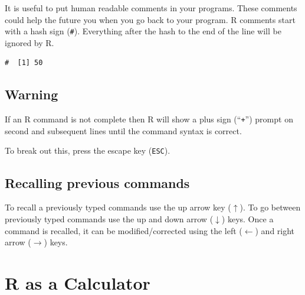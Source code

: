 \documentclass[a4paper,9pt,twocolumn,twoside,printwatermark=false]{pinp}
\begin{document}
It is useful to put human readable comments in your programs. These
comments could help the future you when you go back to your program. R
comments start with a hash sign (\texttt{\#}). Everything after the hash
to the end of the line will be ignored by R.

\begin{Shaded}
\begin{Highlighting}[]
\end{Highlighting}
\end{Shaded}

\begin{ShadedResult}
\begin{verbatim}
#  [1] 50
\end{verbatim}
\end{ShadedResult}

\subsection{Warning}\label{warning}

If an R command is not complete then R will show a plus sign
(``\texttt{+}'') prompt on second and subsequent lines until the command
syntax is correct.

\begin{Shaded}
\begin{Highlighting}[]
\OperatorTok{+}
\end{Highlighting}
\end{Shaded}

To break out this, press the escape key (\texttt{ESC}).

\subsection{Recalling previous
commands}\label{recalling-previous-commands}

To recall a previously typed commands use the up arrow key
(\(\uparrow\)). To go between previously typed commands use the up and
down arrow (\(\downarrow\)) keys. Once a command is recalled, it can be
modified/corrected using the left (\(\leftarrow\)) and right arrow
(\(\rightarrow\)) keys.

\section{R as a Calculator}\label{r-as-a-calculator}
\end{document}

